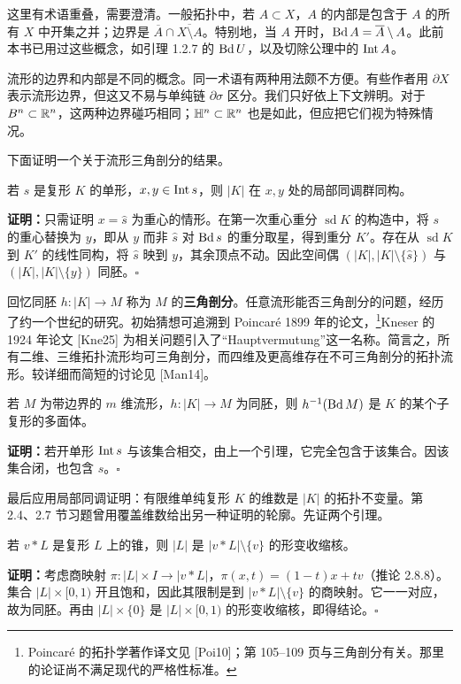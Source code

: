 这里有术语重叠，需要澄清。一般拓扑中，若 $A\subset X$，$A$ 的内部是包含于 $A$ 的所有 $X$ 中开集之并；边界是 $\overline A\cap\overline{X\setminus A}$。特别地，当 $A$ 开时，$\operatorname{Bd} A=\overline A\setminus A$。此前本书已用过这些概念，如引理 1.2.7 的 $\operatorname{Bd} U$，以及切除公理中的 $\operatorname{Int} A$。

流形的边界和内部是不同的概念。同一术语有两种用法颇不方便。有些作者用 $\partial X$ 表示流形边界，但这又不易与单纯链 $\partial\sigma$ 区分。我们只好依上下文辨明。对于 $B^n\subset\mathbb{R}^n$，这两种边界碰巧相同；$\mathbb H^n\subset\mathbb{R}^n$ 也是如此，但应把它们视为特殊情况。

下面证明一个关于流形三角剖分的结果。

若 $s$ 是复形 $K$ 的单形，$x,y\in\operatorname{Int} s$，则 $|K|$ 在 $x,y$ 处的局部同调群同构。

\textbf{证明：}只需证明 $x=\widehat s$ 为重心的情形。在第一次重心重分 $\operatorname{sd}K$ 的构造中，将 $s$ 的重心替换为 $y$，即从 $y$ 而非 $\widehat s$ 对 $\operatorname{Bd} s$ 的重分取星，得到重分 $K'$。存在从 $\operatorname{sd}K$ 到 $K'$ 的线性同构，将 $\widehat s$ 映到 $y$，其余顶点不动。因此空间偶 $(|K|,|K|\setminus\{\widehat s\})$ 与 $(|K|,|K|\setminus\{y\})$ 同胚。\hfill$\square$

回忆同胚 $h:|K|\to M$ 称为 $M$ 的\textbf{三角剖分}。任意流形能否三角剖分的问题，经历了约一个世纪的研究。初始猜想可追溯到 Poincar\'e 1899 年的论文，\footnote{Poincar\'e 的拓扑学著作译文见 [Poi10]；第 105--109 页与三角剖分有关。那里的论证尚不满足现代的严格性标准。}Kneser 的 1924 年论文 [Kne25] 为相关问题引入了“Hauptvermutung”这一名称。简言之，所有二维、三维拓扑流形均可三角剖分，而四维及更高维存在不可三角剖分的拓扑流形。较详细而简短的讨论见 [Man14]。

若 $M$ 为带边界的 $m$ 维流形，$h:|K|\to M$ 为同胚，则 $h^{-1}(\operatorname{Bd} M)$ 是 $K$ 的某个子复形的多面体。

\textbf{证明：}若开单形 $\operatorname{Int} s$ 与该集合相交，由上一个引理，它完全包含于该集合。因该集合闭，也包含 $s$。\hfill$\square$

最后应用局部同调证明：有限维单纯复形 $K$ 的维数是 $|K|$ 的拓扑不变量。第 2.4、2.7 节习题曾用覆盖维数给出另一种证明的轮廓。先证两个引理。

若 $v*L$ 是复形 $L$ 上的锥，则 $|L|$ 是 $|v*L|\setminus\{v\}$ 的形变收缩核。

\textbf{证明：}考虑商映射 $\pi:|L|\times I\to|v*L|$，$\pi(x,t)=(1-t)x+tv$（推论 2.8.8）。集合 $|L|\times[0,1)$ 开且饱和，因此其限制是到 $|v*L|\setminus\{v\}$ 的商映射。它一一对应，故为同胚。再由 $|L|\times\{0\}$ 是 $|L|\times[0,1)$ 的形变收缩核，即得结论。\hfill$\square$

